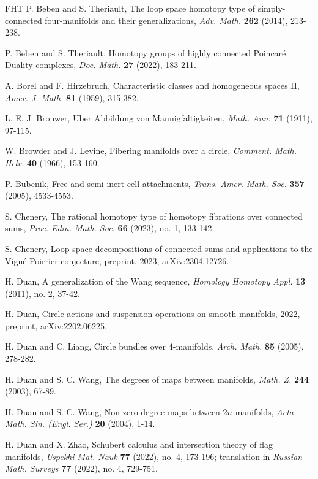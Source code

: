\documentclass[a4]{amsart}
\theoremstyle{definition}
\begin{document}
\begin{sloppypar}
\begin{thebibliography}{FHT}
 P. Beben and S. Theriault, The loop space homotopy type of 
   simply-connected four-manifolds and their generalizations, 
   \emph{Adv. Math.} \textbf{262} (2014), 213-238. 
   
 P. Beben and S. Theriault, Homotopy groups of highly connected Poincar\'{e} Duality complexes, \emph{Doc. Math.} \textbf{27} (2022), 183-211. 


 A. Borel and F. Hirzebruch, Characteristic classes and homogeneous spaces II, \emph{Amer. J. Math.} \textbf{81} (1959), 315-382.

 L. E. J. Brouwer, Uber Abbildung von Mannigfaltigkeiten, \emph{Math. Ann.} \textbf{71} (1911), 97-115.
   
 W. Browder and J. Levine, Fibering manifolds over a circle, \emph{Comment. Math. Helv.} \textbf{40} (1966), 153-160.   

 P. Bubenik, Free and semi-inert cell attachments, \emph{Trans. Amer. Math. Soc.} \textbf{357} (2005), 4533-4553.

 S. Chenery, The rational homotopy type of homotopy fibrations over connected sums, \emph{Proc. Edin. Math. Soc.} \textbf{66} (2023), no. 1, 133-142.

 S. Chenery, Loop space decompositions of connected sums and applications to the Vigu\'{e}-Poirrier conjecture, preprint, 2023, arXiv:2304.12726.

 H. Duan, A generalization of the Wang sequence, \emph{Homology Homotopy Appl.} \textbf{13} (2011), no. 2, 37-42. 

 H. Duan, Circle actions and suspension operations on smooth manifolds, 2022, preprint, arXiv:2202.06225.


 H. Duan and C. Liang, Circle bundles over $4$-manifolds, \emph{Arch. Math.} \textbf{85} (2005), 278-282.

 H. Duan and S. C. Wang, The degrees of maps between manifolds, \emph{Math. Z.} \textbf{244} (2003), 67-89.

 H. Duan and S. C. Wang, Non-zero degree maps between $2n$-manifolds, \emph{Acta Math. Sin. (Engl. Ser.)} \textbf{20} (2004), 1-14.

 H. Duan and X. Zhao, Schubert calculus and intersection theory of flag manifolds, \emph{Uspekhi Mat. Nauk} \textbf{77} (2022), no. 4, 173-196; translation in \emph{Russian Math. Surveys} \textbf{77} (2022), no. 4, 729-751.
   


\end{thebibliography}
\end{sloppypar}
\end{document}
